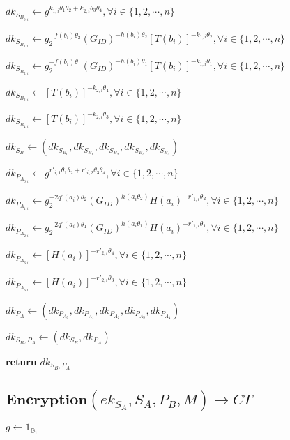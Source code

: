 \documentclass[a4paper]{article}
\begin{document}
$\textit{dk}_{S_{B_{0, i}}} \gets g^{k_{1, i} \theta_1 \theta_2 + k_{2, i} \theta_3 \theta_4}, \forall i \in \{1, 2, \cdots, n\}$

$\textit{dk}_{S_{B_{1, i}}} \gets g_2^{-f(b_i) \theta_2} (G_{\textit{ID}})^{-h(b_i) \theta_2} [T(b_i)]^{-k_{1, i} \theta_2}, \forall i \in \{1, 2, \cdots, n\}$

$\textit{dk}_{S_{B_{2, i}}} \gets g_2^{-f(b_i) \theta_1} (G_{\textit{ID}})^{-h(b_i) \theta_1} [T(b_i)]^{-k_{1, i} \theta_1}, \forall i \in \{1, 2, \cdots, n\}$

$\textit{dk}_{S_{B_{3, i}}} \gets [T(b_i)]^{-k_{2, i} \theta_4}, \forall i \in \{1, 2, \cdots, n\}$

$\textit{dk}_{S_{B_{4, i}}} \gets [T(b_i)]^{-k_{2, i} \theta_3}, \forall i \in \{1, 2, \cdots, n\}$

$\textit{dk}_{S_B} \gets (\textit{dk}_{S_{B_0}}, \textit{dk}_{S_{B_1}}, \textit{dk}_{S_{B_2}}, \textit{dk}_{S_{B_3}}, \textit{dk}_{S_{B_4}})$

$\textit{dk}_{P_{A_{0, i}}} \gets g^{r'_{i, 1} \theta_1 \theta_2 + r'_{i, 2} \theta_3 \theta_4}, \forall i \in \{1, 2, \cdots, n\}$

$\textit{dk}_{P_{A_{1, i}}} \gets g_2^{-2q'(a_i) \theta_2} (G_{\textit{ID}})^{h(a_i \theta_2)} H(a_i)^{-r'_{1, i} \theta_2}, \forall i \in \{1, 2, \cdots, n\}$

$\textit{dk}_{P_{A_{2, i}}} \gets g_2^{-2q'(a_i) \theta_1} (G_{\textit{ID}})^{h(a_i \theta_1)} H(a_i)^{-r'_{1, i} \theta_1}, \forall i \in \{1, 2, \cdots, n\}$

$\textit{dk}_{P_{A_{3, i}}} \gets [H(a_i)]^{-r'_{2, i} \theta_4}, \forall i \in \{1, 2, \cdots, n\}$

$\textit{dk}_{P_{A_{3, i}}} \gets [H(a_i)]^{-r'_{2, i} \theta_3}, \forall i \in \{1, 2, \cdots, n\}$

$\textit{dk}_{P_A} \gets (\textit{dk}_{P_{A_0}}, \textit{dk}_{P_{A_1}}, \textit{dk}_{P_{A_2}}, \textit{dk}_{P_{A_3}}, \textit{dk}_{P_{A_4}})$

$\textit{dk}_{S_B, P_A} \gets (\textit{dk}_{S_B}, \textit{dk}_{P_A})$

\textbf{return} $\textit{dk}_{S_B, P_A}$

\subsection{$\textbf{Encryption}(\textit{ek}_{S_A}, S_A, P_B, M) \rightarrow \textit{CT}$}

$g \gets 1_{\mathbb{G}_1}$
\end{document}
